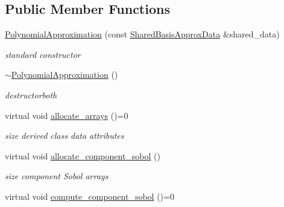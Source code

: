 \subsection*{Public Member Functions}
\begin{DoxyCompactItemize}
\item 
\hyperlink{classPecos_1_1PolynomialApproximation_acce5e029c6bfc26288c4d695a15b6604}{Polynomial\+Approximation} (const \hyperlink{classPecos_1_1SharedBasisApproxData}{Shared\+Basis\+Approx\+Data} \&shared\+\_\+data)\label{classPecos_1_1PolynomialApproximation_acce5e029c6bfc26288c4d695a15b6604}

\begin{DoxyCompactList}\small\item\em standard constructor \end{DoxyCompactList}\item 
\hyperlink{classPecos_1_1PolynomialApproximation_ac6deeb4b25bdc57d94bcdf7b37823ce7}{$\sim$\+Polynomial\+Approximation} ()\label{classPecos_1_1PolynomialApproximation_ac6deeb4b25bdc57d94bcdf7b37823ce7}

\begin{DoxyCompactList}\small\item\em destructorboth \end{DoxyCompactList}\item 
virtual void \hyperlink{classPecos_1_1PolynomialApproximation_ae52119f660e0118d838f45bffb7d12d1}{allocate\+\_\+arrays} ()=0\label{classPecos_1_1PolynomialApproximation_ae52119f660e0118d838f45bffb7d12d1}

\begin{DoxyCompactList}\small\item\em size derived class data attributes \end{DoxyCompactList}\item 
virtual void \hyperlink{classPecos_1_1PolynomialApproximation_a489e05c9d1bc07d7120ce3dfc9a7e66a}{allocate\+\_\+component\+\_\+sobol} ()\label{classPecos_1_1PolynomialApproximation_a489e05c9d1bc07d7120ce3dfc9a7e66a}

\begin{DoxyCompactList}\small\item\em size component Sobol arrays \end{DoxyCompactList}\item 
virtual void \hyperlink{classPecos_1_1PolynomialApproximation_ae369b467e0829f05cfcd1b68d90fb741}{compute\+\_\+component\+\_\+sobol} ()=0\label{classPecos_1_1PolynomialApproximation_ae369b467e0829f05cfcd1b68d90fb741}


\end{DoxyCompactItemize}
